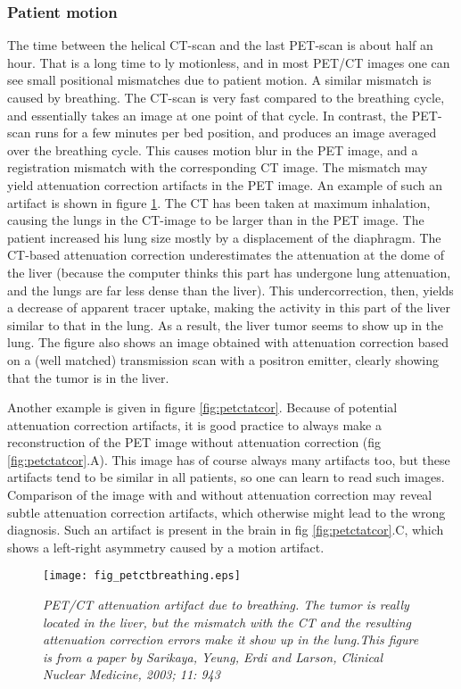\subsubsection{Patient motion}
The time between the helical CT-scan and the last PET-scan is about half an
hour. That is a long time to ly motionless, and in most PET/CT images one can
see small positional mismatches due to patient motion. A similar mismatch is
caused by breathing. The CT-scan is very fast compared to the breathing cycle,
and essentially takes an image at one point of that cycle. In contrast, the
PET-scan runs for a few minutes per bed position, and produces an image
averaged over the breathing cycle. This causes motion blur in the PET image,
and a registration mismatch with the corresponding CT image. The mismatch may
yield attenuation correction artifacts in the PET image. An example of such an
artifact is shown in figure \ref{fig:petctbreathing}. The CT has been taken at
maximum inhalation, causing the lungs in the CT-image to be larger than in the
PET image. The patient increased his lung size mostly by a displacement of the
diaphragm. The CT-based attenuation correction underestimates the attenuation
at the dome of the liver (because the computer thinks this part has undergone
lung attenuation, and the lungs are far less dense than the liver). This
undercorrection, then, yields a decrease of apparent tracer uptake, making the
activity in this part of the liver similar to that in the lung. As a result,
the liver tumor seems to show up in the lung. The figure also shows an image
obtained with attenuation correction based on a (well matched) transmission
scan with a positron emitter, clearly showing that the tumor is in the
liver.

Another example is given in figure \ref{fig:petctatcor}. Because of
potential attenuation correction artifacts, it is good practice to
always make a reconstruction of the PET image without attenuation
correction (fig \ref{fig:petctatcor}.A). This image has of course
always many artifacts too, but these artifacts tend to be similar in all
patients, so one can learn to read such images. Comparison of the
image with and without attenuation correction may reveal subtle
attenuation correction artifacts, which otherwise might lead to the
wrong diagnosis. Such an artifact is present in the brain in fig
\ref{fig:petctatcor}.C, which shows a left-right asymmetry caused by a
motion artifact.

%
\begin{figure}[tbp]
\centering
\texttt{[image: fig\_petctbreathing.eps]}
\caption{\label{fig:petctbreathing} \emph{PET/CT attenuation artifact
due to breathing. The tumor is really located in the liver, but the
mismatch with the CT and the resulting attenuation correction errors
make it show up in the lung.This figure is from a paper by Sarikaya,
Yeung, Erdi and Larson, Clinical Nuclear Medicine, 2003; 11: 943}}
\end{figure}

